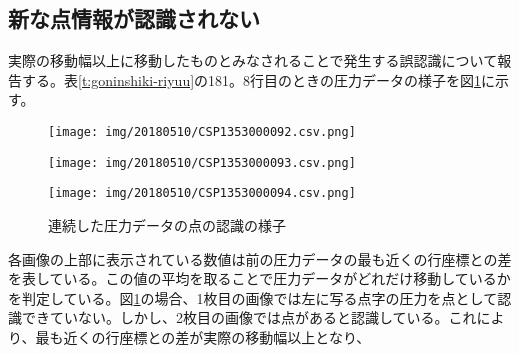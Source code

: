 \subsection{新な点情報が認識されない}
実際の移動幅以上に移動したものとみなされることで発生する誤認識について報告する。表\ref{t:goninshiki-riyuu}の181。8行目のときの圧力データの様子を図\ref{ff:goninshiki_merge}に示す。
\begin{figure}[H]
	\centering
	\begin{minipage}[b]{0.3\linewidth}
		\centering
		\texttt{[image: img/20180510/CSP1353000092.csv.png]}
	\end{minipage}
	\begin{minipage}[b]{0.3\linewidth}
		\centering
		\texttt{[image: img/20180510/CSP1353000093.csv.png]}
	\end{minipage}
	\begin{minipage}[b]{0.3\linewidth}
		\centering
		\texttt{[image: img/20180510/CSP1353000094.csv.png]}
	\end{minipage}
	\caption{連続した圧力データの点の認識の様子}
	\label{ff:goninshiki_merge}
\end{figure}
各画像の上部に表示されている数値は前の圧力データの最も近くの行座標との差を表している。この値の平均を取ることで圧力データがどれだけ移動しているかを判定している。図\ref{ff:goninshiki_merge}の場合、1枚目の画像では左に写る点字の圧力を点として認識できていない。しかし、2枚目の画像では点があると認識している。これにより、最も近くの行座標との差が実際の移動幅以上となり、  

